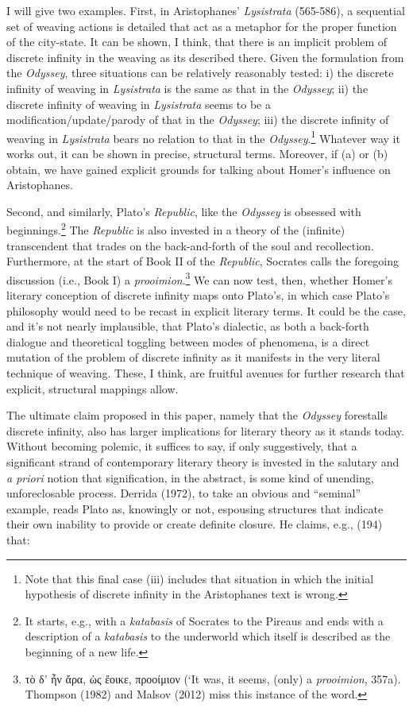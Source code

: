 \documentclass[12pt]{article}
\begin{document}
I will give two examples. First, in Aristophanes' \textit{Lysistrata} (565-586), a sequential set of weaving actions is detailed that act as a metaphor for the proper function of the city-state. It can be shown, I think, that there is an implicit problem of discrete infinity in the weaving as its described there. Given the formulation from the \textit{Odyssey}, three situations can be relatively reasonably tested: i) the discrete infinity of weaving in \textit{Lysistrata} is the same as that in the \textit{Odyssey}; ii) the discrete infinity of weaving in \textit{Lysistrata} seems to be a modification/update/parody of that in the \textit{Odyssey}; iii) the discrete infinity of weaving in \textit{Lysistrata} bears no relation to that in the \textit{Odyssey}.\footnote{ Note that this final case (iii) includes that situation in which the initial hypothesis of discrete infinity in the Aristophanes text is wrong.} Whatever way it works out, it can be shown in precise, structural terms. Moreover, if (a) or (b) obtain, we have gained explicit grounds for talking about Homer's influence on Aristophanes.

Second, and similarly, Plato's \textit{Republic}, like the \textit{Odyssey} is obsessed with beginnings.\footnote{ It starts, e.g., with a \textit{katabasis} of Socrates to the Pireaus and ends with a description of a \textit{katabasis} to the underworld which itself is described as the beginning of a new life.} The \textit{Republic} is also invested in a theory of the (infinite) transcendent that trades on the back-and-forth of the soul and recollection. Furthermore, at the start of Book II of the \textit{Republic}, Socrates calls the foregoing discussion (i.e., Book I) a \textit{prooimion}.\footnote{ τὸ δ’ ἦν ἄρα, ὡς ἔοικε, προοίμιον (`It was, it seems, (only) a \textit{prooimion}, 357a). Thompson (1982) and Malsov (2012) miss this instance of the word.} We can now test, then, whether Homer's literary conception of discrete infinity maps onto Plato's, in which case Plato's philosophy would need to be recast in explicit literary terms. It could be the case, and it's not nearly implausible, that Plato's dialectic, as both a back-forth dialogue and theoretical toggling between modes of phenomena, is a direct mutation of the problem of discrete infinity as it manifests in the very literal technique of weaving. These, I think, are fruitful avenues for further research that explicit, structural mappings allow.

The ultimate claim proposed in this paper, namely that the \textit{Odyssey} forestalls discrete infinity, also has larger implications for literary theory as it stands today. Without becoming polemic, it suffices to say, if only suggestively, that a significant strand of contemporary literary theory is invested in the salutary and \textit{a priori} notion that signification, in the abstract, is some kind of unending, unforeclosable process. Derrida (1972), to take an obvious and ``seminal'' example, reads Plato as, knowingly or not, espousing structures that indicate their own inability to provide or create definite closure. He claims, e.g., (194) that:
\end{document}
